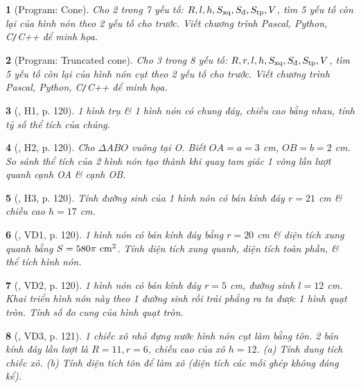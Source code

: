 \documentclass{article}
\newtheorem{baitoan}{}
\begin{document}
\begin{baitoan}[{\sf Program}: Cone]
	Cho 2 trong 7 yếu tố: $R,l,h,S_{\rm xq},S_{\scriptsize\mbox{\rm đ}},S_{\rm tp},V$, tìm 5 yếu tố còn lại của hình nón theo 2 yếu tố cho trước. Viết chương trình {\sf Pascal, Python, C{\tt/}C++} để minh họa.
\end{baitoan}

\begin{baitoan}[{\sf Program}: Truncated cone]
	Cho 3 trong 8 yếu tố: $R,r,l,h,S_{\rm xq},S_{\scriptsize\mbox{\rm đ}},S_{\rm tp},V$, tìm 5 yếu tố còn lại của hình nón cụt theo 2 yếu tố cho trước. Viết chương trình {\sf Pascal, Python, C{\tt/}C++} để minh họa.
\end{baitoan}

\begin{baitoan}[\cite{Binh_boi_duong_Toan_9_tap_2}, H1, p. 120]
	1 hình trụ \& 1 hình nón có chung đáy, chiều cao bằng nhau, tính tỷ số thể tích của chúng.
\end{baitoan}

\begin{baitoan}[\cite{Binh_boi_duong_Toan_9_tap_2}, H2, p. 120]
	Cho $\Delta ABO$ vuông tại O. Biết $OA = a = 3$ {\rm cm}, $OB = b = 2$ {\rm cm}. So sánh thể tích của 2 hình nón tạo thành khi quay tam giác 1 vòng lần lượt quanh cạnh OA \& cạnh OB.
\end{baitoan}

\begin{baitoan}[\cite{Binh_boi_duong_Toan_9_tap_2}, H3, p. 120]
	Tính đường sinh của 1 hình nón có bán kính đáy $r = 21$ {\rm cm} \& chiều cao $h = 17$ {\rm cm}.
\end{baitoan}

\begin{baitoan}[\cite{Binh_boi_duong_Toan_9_tap_2}, VD1, p. 120]
	1 hình nón có bán kính đáy bằng $r = 20$ {\rm cm} \& diện tích xung quanh bằng $S = 580\pi\ {\rm cm}^2$. Tính diện tích xung quanh, diện tích toàn phần, \& thể tích hình nón.
\end{baitoan}

\begin{baitoan}[\cite{Binh_boi_duong_Toan_9_tap_2}, VD2, p. 120]
	1 hình nón có bán kính đáy $r = 5$ {\rm cm}, đường sinh $l = 12$ {\rm cm}. Khai triển hình nón này theo 1 đường sinh rồi trải phẳng ra ta được 1 hình quạt tròn. Tính số đo cung của hình quạt tròn.
\end{baitoan}

\begin{baitoan}[\cite{Binh_boi_duong_Toan_9_tap_2}, VD3, p. 121]
	1 chiếc xô nhỏ đựng nước hình nón cụt làm bằng tôn. 2 bán kính đáy lần lượt là $R = 11,r = 6$, chiều cao của xô $h = 12$. (a) Tính dung tích chiếc xô. (b) Tính diện tích tôn để làm xô (diện tích các mối ghép không đáng kể).
\end{baitoan}
\end{document}
